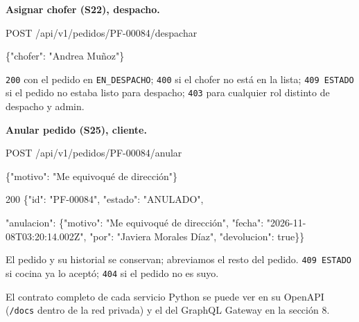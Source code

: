 \textbf{Asignar chofer (S22), despacho.}


\begin{codigo}
POST /\allowbreak{}api/\allowbreak{}v1/\allowbreak{}pedidos/\allowbreak{}PF-\allowbreak{}00084/\allowbreak{}despachar\par
\{"chofer":\allowbreak{} "Andrea Muñoz"\}\par
\end{codigo}

\texttt{200} con el pedido en \texttt{EN\_\allowbreak{}DESPACHO}; \texttt{400} si el chofer no está en la lista; \texttt{409 ESTADO} si el pedido no estaba listo para despacho; \texttt{403} para cualquier rol distinto de despacho y admin.


\textbf{Anular pedido (S25), cliente.}


\begin{codigo}
POST /\allowbreak{}api/\allowbreak{}v1/\allowbreak{}pedidos/\allowbreak{}PF-\allowbreak{}00084/\allowbreak{}anular\par
\{"motivo":\allowbreak{} "Me equivoqué de dirección"\}\par
\end{codigo}

\begin{codigo}
200 \{"id":\allowbreak{} "PF-\allowbreak{}00084",\allowbreak{} "estado":\allowbreak{} "ANULADO",\allowbreak{}\par
\hspace*{5\ttw}"anulacion":\allowbreak{} \{"motivo":\allowbreak{} "Me equivoqué de dirección",\allowbreak{} "fecha":\allowbreak{} "2026-\allowbreak{}11-\allowbreak{}08T03:\allowbreak{}20:\allowbreak{}14.\allowbreak{}002Z",\allowbreak{} "por":\allowbreak{} "Javiera Morales Díaz",\allowbreak{} "devolucion":\allowbreak{} true\}\}\par
\end{codigo}

El pedido y su historial se conservan; abreviamos el resto del pedido. \texttt{409 ESTADO} si cocina ya lo aceptó; \texttt{404} si el pedido no es suyo.


El contrato completo de cada servicio Python se puede ver en su OpenAPI (\texttt{/\allowbreak{}docs} dentro de la red privada) y el del GraphQL Gateway en la sección 8.

